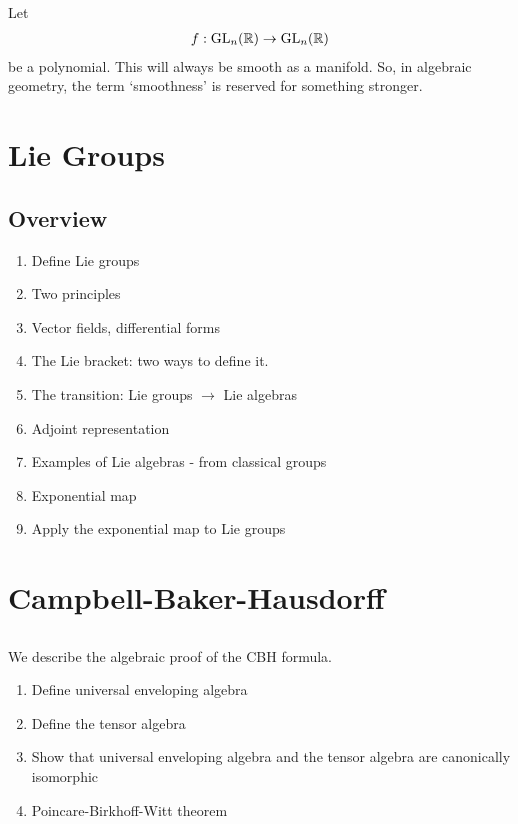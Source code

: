 \begin{insight} %
    Let 
    \begin{align}
        f: \operatorname{GL}_n(\mathbb{R}) \to \operatorname{GL}_n(\mathbb{R})
    \end{align}
    be a polynomial. This will always be smooth as a manifold. So, in algebraic geometry, the term `smoothness' is reserved for something stronger.
\end{insight}


\chapter{Lie Groups}
\label{cha:lie_groups}

\section{Overview}
\label{sec:overview}

\begin{enumerate}
    \makethislistcompact
    \item Define Lie groups
    \item Two principles
    \item Vector fields, differential forms
    \item The Lie bracket: two ways to define it.
    \item The transition: Lie groups $\to$  Lie algebras
    \item Adjoint representation
    \item Examples of Lie algebras - from classical groups
    \item Exponential map
    \item Apply the exponential map to Lie groups
\end{enumerate}




\chapter{Campbell-Baker-Hausdorff}
\section{}
We describe the algebraic proof of the CBH formula. 

\begin{enumerate}
    \makethislistcompact
    \item Define universal enveloping algebra
    \item Define the tensor algebra
    \item Show that universal enveloping algebra and the tensor algebra are canonically isomorphic
    \item Poincare-Birkhoff-Witt theorem
\end{enumerate}

